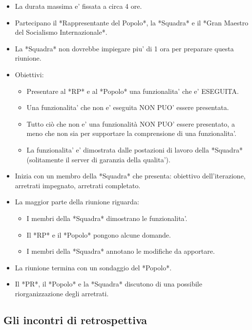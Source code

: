 \begin{itemize}
  \item La durata massima e' fissata a circa 4 ore.
  \item Partecipano il *Rappresentante del Popolo*, la *Squadra* e il *Gran Maestro del Socialismo Internazionale*.
  \item La *Squadra* non dovrebbe impiegare piu' di 1 ora per preparare questa riunione.
  \item Obiettivi:
  \begin{itemize}
    \item Presentare al *RP* e al *Popolo* una funzionalita' che e' ESEGUITA.
    \item Una funzionalita' che non e' eseguita NON PUO' essere presentata.
    \item Tutto ciò che non e' una funzionalità NON PUO' essere presentato, a meno che non sia per supportare la comprensione di una funzionalita'.
    \item La funzionalita' e' dimostrata dalle postazioni di lavoro della *Squadra* (solitamente il server di garanzia della qualita').
  \end{itemize}
  \item Inizia con un membro della *Squadra* che presenta: obiettivo dell'iterazione, arretrati impegnato, arretrati completato.
  \item La maggior parte della riunione riguarda:
  \begin{itemize}
    \item I membri della *Squadra* dimostrano le funzionalita'.
    \item Il *RP* e il *Popolo* pongono alcune domande.
    \item I membri della *Squadra* annotano le modifiche da apportare.
  \end{itemize}
  \item La riunione termina con un sondaggio del *Popolo*.
  \item Il *PR*, il *Popolo* e la *Squadra* discutono di una possibile riorganizzazione degli arretrati.
\end{itemize}

\subsection{Gli incontri di retrospettiva}

